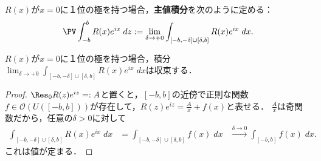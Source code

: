 \documentclass[uplatex, dvipdfmx]{jsreport}
\begin{document}
\begin{definition}
    $R(x)$が$x=0$に１位の極を持つ場合，\textbf{主値積分}を次のように定める：
    \[\PV\int^b_{-b}R(x)e^{ix}\;dz:=\lim_{\delta\to+0}\int_{[-b,-\delta]\cup[\delta,b]}R(x)e^{ix}\;dx.\]
\end{definition}

\begin{lemma}
    $R(x)$が$x=0$に１位の極を持つ場合，積分$\lim_{\delta\to+0}\int_{[-b,-\delta]\cup[\delta,b]}R(x)e^{ix}\;dx$は収束する．
\end{lemma}
\begin{proof}
    $\Res_0R(z)e^{iz}=:A$と置くと，$[-b,b]$の近傍で正則な関数$f\in\mathcal{O}(U([-b,b]))$が存在して，$R(z)e^{iz}=\frac{A}{x}+f(x)$と表せる．
    $\frac{A}{x}$は奇関数だから，任意の$\delta>0$に対して
    \begin{align*}
        \int_{[-b,-\delta]\cup[\delta,b]}R(x)e^{ix}\;dx&=\int_{[-b,-\delta]\cup[\delta,b]}f(x)\;dx
        &\xrightarrow{\delta\to 0}\int_{[-b,b]}f(x)\;dx.
    \end{align*}
    これは値が定まる．
\end{proof}
\end{document}

